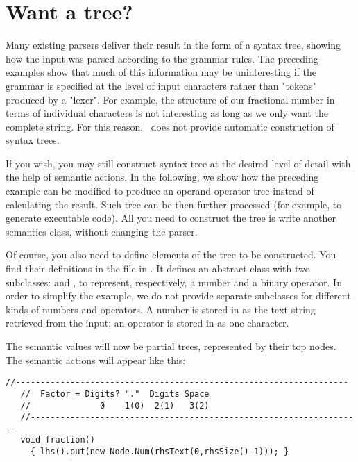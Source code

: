 \newpage

\section{Want a tree?\label{tree}}


Many existing parsers deliver their result in the form of a syntax tree,
showing how the input was parsed according to the grammar rules.
The preceding examples show that much of this information may be
uninteresting if the grammar is specified at the level
of input characters rather than "tokens" produced by a "lexer".
For example, the structure of our fractional number 
in terms of individual characters is not interesting 
as long as we only want the complete string.
For this reason, \Mouse\ does not provide automatic construction
of syntax trees.

If you wish, you may still construct syntax tree at the desired level of detail
with the help of semantic actions.
In the following, we show how the preceding example
can be modified to produce an operand-operator tree
instead of calculating the result.
Such tree can be then further processed
(for example, to generate executable code).
All you need to construct the tree is write another semantics class,
without changing the parser.

Of course, you also need to define elements of the tree to be constructed.
You find their definitions in the file  in .
It defines an abstract class  with two subclasses:
 and ,
to represent, respectively, a number 
and a binary operator.
%
In order to simplify the example, we do not provide separate subclasses
for different kinds of numbers and operators.
A number is stored in  as the text string retrieved from the input;
an operator is stored in  as one character.

The semantic values will now be partial trees, represented by their top nodes.
The semantic actions will appear like this:

\small
\begin{Verbatim}[frame=single,framesep=2mm,samepage=true,xleftmargin=15mm,xrightmargin=15mm,baselinestretch=0.8]
   //-------------------------------------------------------------------
   //  Factor = Digits? "."  Digits Space
   //              0    1(0)  2(1)   3(2)
   //-------------------------------------------------------------------
   void fraction()
     { lhs().put(new Node.Num(rhsText(0,rhsSize()-1))); }
\end{Verbatim}
\normalsize

